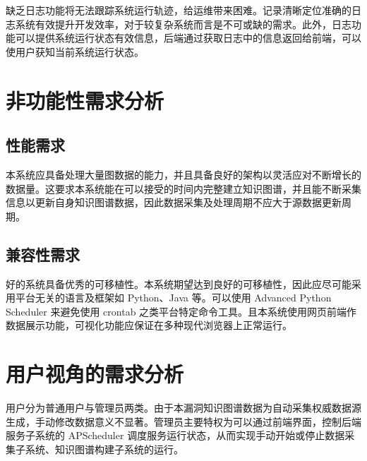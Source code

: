 \documentclass[a4paper,AutoFakeBold,oneside,12pt]{book}
\begin{document}
缺乏日志功能将无法跟踪系统运行轨迹，给运维带来困难。记录清晰定位准确的日志系统有效提升开发效率，对于较复杂系统而言是不可或缺的需求。此外，日志功能可以提供系统运行状态有效信息，后端通过获取日志中的信息返回给前端，可以使用户获知当前系统运行状态。

\section{非功能性需求分析}

\subsection{性能需求}

本系统应具备处理大量图数据的能力，并且具备良好的架构以灵活应对不断增长的数据量。这要求本系统能在可以接受的时间内完整建立知识图谱，并且能不断采集信息以更新自身知识图谱数据，因此数据采集及处理周期不应大于源数据更新周期。

\subsection{兼容性需求}

好的系统具备优秀的可移植性。本系统期望达到良好的可移植性，因此应尽可能采用平台无关的语言及框架如 Python、Java 等。可以使用 Advanced Python Scheduler 来避免使用 crontab 之类平台特定命令工具。且本系统使用网页前端作数据展示功能，可视化功能应保证在多种现代浏览器上正常运行。

\section{用户视角的需求分析}

用户分为普通用户与管理员两类。由于本漏洞知识图谱数据为自动采集权威数据源生成，手动修改数据意义不显著。管理员主要特权为可以通过前端界面，控制后端服务子系统的 APScheduler 调度服务运行状态，从而实现手动开始或停止数据采集子系统、知识图谱构建子系统的运行。
\end{document}
